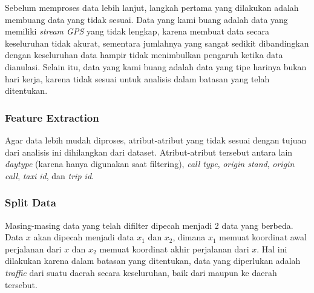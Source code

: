 \documentclass{article}
\begin{document}
\begin{adjustwidth}{4em}{0pt}
	
\hspace{\parindent}Sebelum memproses data lebih lanjut, langkah pertama yang dilakukan adalah membuang data yang tidak sesuai. Data yang kami buang adalah data yang memiliki \textit{stream GPS} yang tidak lengkap, karena membuat data secara keseluruhan tidak akurat, sementara jumlahnya yang sangat sedikit dibandingkan dengan keseluruhan data hampir tidak menimbulkan pengaruh ketika data dianulasi. Selain itu, data yang kami buang adalah data yang tipe harinya bukan hari kerja, karena tidak sesuai untuk analisis dalam batasan yang telah ditentukan.

\end{adjustwidth}

\subsubsection{Feature Extraction}

\begin{adjustwidth}{4em}{0pt}
	
	\hspace{\parindent}Agar data lebih mudah diproses, atribut-atribut yang tidak sesuai dengan tujuan dari analisis ini dihilangkan dari dataset. Atribut-atribut tersebut antara lain \textit{daytype} (karena hanya digunakan saat filtering), \textit{call type}, \textit{origin stand}, \textit{origin call}, \textit{taxi id}, dan \textit{trip id}.
	
\end{adjustwidth}

\subsubsection{Split Data}

\begin{adjustwidth}{4em}{0pt}
	
	\hspace{\parindent}Masing-masing data yang telah difilter dipecah menjadi 2 data yang berbeda. Data $x$ akan dipecah menjadi data $x_1$ dan $x_2$, dimana $x_1$ memuat koordinat awal perjalanan dari $x$ dan $x_2$ memuat koordinat akhir perjalanan dari $x$. Hal ini dilakukan karena dalam batasan yang ditentukan, data yang diperlukan adalah \textit{traffic} dari suatu daerah secara keseluruhan, baik dari maupun ke daerah tersebut.
	
\end{adjustwidth}
\end{document}
